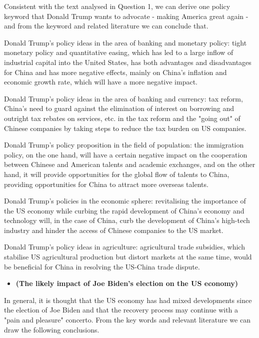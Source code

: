 \documentclass{apmcmthesis}
\begin{document}
Consistent with the text analysed in Question 1, we can derive one policy keyword that Donald Trump wants to advocate - making America great again - and from the keyword and related literature we can conclude that.

Donald Trump's policy ideas in the area of banking and monetary policy: tight monetary policy and quantitative easing, which has led to a large inflow of industrial capital into the United States, has both advantages and disadvantages for China and has more negative effects, mainly on China's inflation and economic growth rate, which will have a more negative impact.

Donald Trump's policy ideas in the area of banking and currency: tax reform, China's need to guard against the elimination of interest on borrowing and outright tax rebates on services, etc. in the tax reform and the "going out" of Chinese companies by taking steps to reduce the tax burden on US companies.

Donald Trump's policy proposition in the field of population: the immigration policy, on the one hand, will have a certain negative impact on the cooperation between Chinese and American talents and academic exchanges, and on the other hand, it will provide opportunities for the global flow of talents to China, providing opportunities for China to attract more overseas talents.

Donald Trump's policies in the economic sphere: revitalising the importance of the US economy while curbing the rapid development of China's economy and technology will, in the case of China, curb the development of China's high-tech industry and hinder the access of Chinese companies to the US market.

Donald Trump's policy ideas in agriculture: agricultural trade subsidies, which stabilise US agricultural production but distort markets at the same time, would be beneficial for China in resolving the US-China trade dispute.


\begin{itemize}
	\item \textbf{(The likely impact of Joe Biden's election on the US economy)}
\end{itemize}

In general, it is thought that the US economy has had mixed developments since the election of Joe Biden and that the recovery process may continue with a "pain and pleasure" concerto. From the key words and relevant literature we can draw the following conclusions.
\end{document}
